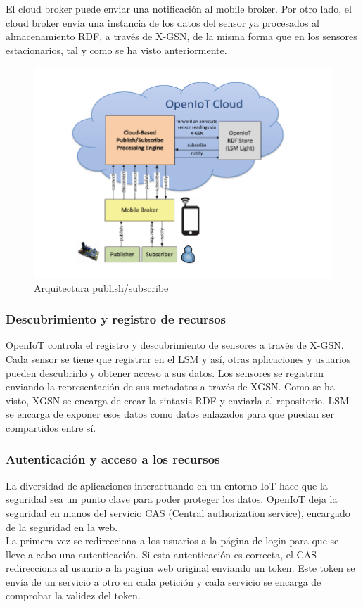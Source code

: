 \documentclass[12pt, twoside]{book}
\begin{document}
El cloud broker puede enviar una notificación al mobile broker. Por otro lado, el cloud broker envía una instancia de los datos del sensor ya procesados al almacenamiento RDF, a través de X-GSN, de la misma forma que en los sensores estacionarios, tal y como se ha visto anteriormente.


\begin{figure}[H]
\centering
\includegraphics[scale=0.8]{images/mobilebroker_openiot}
\caption{Arquitectura publish/subscribe}\label{L306}
\end{figure}
\subsubsection{Descubrimiento y registro de recursos}
OpenIoT controla el registro y descubrimiento de sensores a través de X-GSN. Cada sensor se tiene que registrar en el LSM y así, otras aplicaciones y usuarios pueden descubrirlo y obtener acceso a sus datos. Los sensores se registran enviando la representación de sus metadatos a través de XGSN. Como se ha visto, XGSN se encarga de crear la sintaxis RDF y enviarla al repositorio. LSM se encarga de exponer esos datos como datos enlazados para que puedan ser compartidos entre sí.
\subsubsection{Autenticación y acceso a los recursos}
La diversidad de aplicaciones interactuando en un entorno IoT hace que la seguridad sea un punto clave para poder proteger los datos. OpenIoT deja la seguridad en manos del servicio CAS (Central authorization service), encargado de la seguridad en la web.\\

La primera vez se redirecciona a los usuarios a la página de login para que se lleve a cabo una autenticación. Si esta autenticación es correcta, el CAS redirecciona al usuario a la pagina web original enviando un token. Este token se envía de un servicio a otro en cada petición y cada servicio se encarga de comprobar la validez del token.
\end{document}
